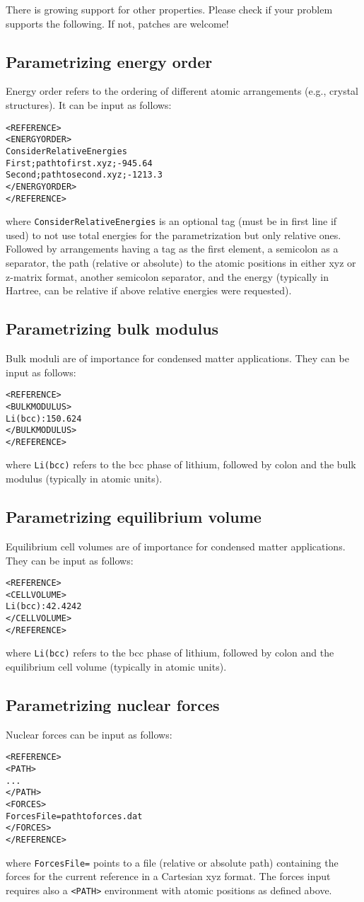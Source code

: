\documentclass[a4paper,10pt]{scrbook}
\begin{document}
There is growing support for other properties. Please check if your problem supports the following. If not, patches are welcome!

\subsection{Parametrizing energy order}
Energy order refers to the ordering of different atomic arrangements (e.g., crystal structures). It can be input as follows:
\begin{verbatim}
<REFERENCE>
<ENERGYORDER>
ConsiderRelativeEnergies
First;pathtofirst.xyz;-945.64
Second;pathtosecond.xyz;-1213.3
</ENERGYORDER>
</REFERENCE>
\end{verbatim}
where \texttt{ConsiderRelativeEnergies} is an optional tag (must be in first line if used) to not use total energies for the parametrization
but only relative ones. Followed by arrangements having a tag as the first element, a semicolon as a separator, the path (relative or absolute)
to the atomic positions in either xyz or z-matrix format, another semicolon separator, and the energy (typically in Hartree, can be relative if above relative energies were requested).

\subsection{Parametrizing bulk modulus}
Bulk moduli are of importance for condensed matter applications. They can be input as follows:
\begin{verbatim}
<REFERENCE>
<BULKMODULUS>
Li(bcc):150.624
</BULKMODULUS>
</REFERENCE>
\end{verbatim}
where \texttt{Li(bcc)} refers to the bcc phase of lithium, followed by colon and the bulk modulus (typically in atomic units).

\subsection{Parametrizing equilibrium volume}
Equilibrium cell volumes are of importance for condensed matter applications. They can be input as follows:
\begin{verbatim}
<REFERENCE>
<CELLVOLUME>
Li(bcc):42.4242
</CELLVOLUME>
</REFERENCE>
\end{verbatim}
where \texttt{Li(bcc)} refers to the bcc phase of lithium, followed by colon and the equilibrium cell volume (typically in atomic units).

\subsection{Parametrizing nuclear forces}
Nuclear forces can be input as follows:
\begin{verbatim}
<REFERENCE>
<PATH>
...
</PATH>
<FORCES>
ForcesFile=pathtoforces.dat
</FORCES>
</REFERENCE>
\end{verbatim}
where \texttt{ForcesFile=} points to a file (relative or absolute path) containing the forces for the current reference in a Cartesian xyz format. The forces input requires also a \texttt{<PATH>} environment with atomic positions as defined above.
\end{document}
